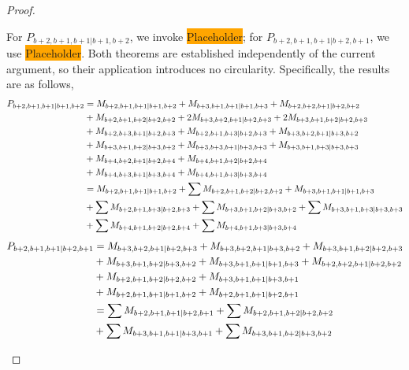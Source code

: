 \begin{proof}
\begin{enumerate}
\begin{enumerate}
For $P_{b+2,b+1,b+1|b+1,b+2}$, we invoke \colorbox{orange}{Placeholder}; for $P_{b+2,b+1,b+1|b+2,b+1}$, we use \colorbox{orange}{Placeholder}. Both theorems are established independently of the current argument, so their application introduces no circularity. Specifically, the results are as follows,
\begin{equation}\notag
  \begin{aligned}
    P_{b+2,b+1,b+1|b+1,b+2} &= M_{b+2,b+1,b+1|b+1,b+2}
+M_{b+3,b+1,b+1|b+1,b+3}
+M_{b+2,b+2,b+1|b+2,b+2}\\
                                              &
+M_{b+2,b+1,b+2|b+2,b+2}
+2M_{b+3,b+2,b+1|b+2,b+3}
+2M_{b+3,b+1,b+2|b+2,b+3}\\
                                              &
+M_{b+2,b+3,b+1|b+2,b+3}
+M_{b+2,b+1,b+3|b+2,b+3}
+M_{b+3,b+2,b+1|b+3,b+2}\\
                                              &
+M_{b+3,b+1,b+2|b+3,b+2}
+M_{b+3,b+3,b+1|b+3,b+3}
+M_{b+3,b+1,b+3|b+3,b+3}\\
                                              &
+M_{b+4,b+2,b+1|b+2,b+4}
+M_{b+4,b+1,b+2|b+2,b+4}\\
                                              &
+M_{b+4,b+3,b+1|b+3,b+4}
+M_{b+4,b+1,b+3|b+3,b+4} \\
         &=
 M_{b+2,b+1,b+1|b+1,b+2}
+\sum M_{b+2,b+1,b+2|b+2,b+2}
+ M_{b+3,b+1,b+1|b+1,b+3}\\
                                              &
+\sum M_{b+2,b+1,b+3|b+2,b+3}
+\sum M_{b+3,b+1,b+2|b+3,b+2}
+\sum M_{b+3,b+1,b+3|b+3,b+3}\\
                                              &
+\sum M_{b+4,b+1,b+2|b+2,b+4}
+\sum M_{b+4,b+1,b+3|b+3,b+4}
  \end{aligned}
\end{equation}
\begin{equation}\notag
  \begin{aligned}
    P_{b+2,b+1,b+1|b+2,b+1}&=M_{b+3,b+2,b+1|b+2,b+3}
+M_{b+3,b+2,b+1|b+3,b+2}
+M_{b+3,b+1,b+2|b+2,b+3}\\
                                              &
+M_{b+3,b+1,b+2|b+3,b+2}
+M_{b+3,b+1,b+1|b+1,b+3}
+M_{b+2,b+2,b+1|b+2,b+2}\\
                                              &
+M_{b+2,b+1,b+2|b+2,b+2}
+M_{b+3,b+1,b+1|b+3,b+1}\\
                                              &
+M_{b+2,b+1,b+1|b+1,b+2}
+M_{b+2,b+1,b+1|b+2,b+1} \\
                           &=
\sum M_{b+2,b+1,b+1|b+2,b+1}
+\sum M_{b+2,b+1,b+2|b+2,b+2}\\
                                              &
+\sum M_{b+3,b+1,b+1|b+3,b+1}
+\sum M_{b+3,b+1,b+2|b+3,b+2}
  \end{aligned}
\end{equation}


\end{enumerate}
\end{enumerate}
\end{proof}
